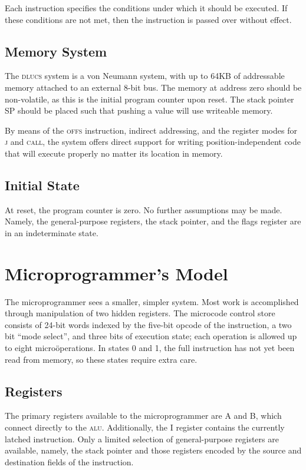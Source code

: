 \documentclass[11pt]{book}
\begin{document}
Each instruction specifies the conditions
under which it should be executed.
If these conditions are not met,
then the instruction is passed over without effect.

\subsection{Memory System}
The \textsc{dlucs} system is a von Neumann system,
with up to 64KB of addressable memory
attached to an external 8-bit bus.
The memory at address zero should be non-volatile,
as this is the initial program counter upon reset.
The stack pointer SP should be placed
such that pushing a value will use writeable memory.

By means of the \textsc{offs} instruction,
indirect addressing, and
the register modes for \textsc{j} and \textsc{call},
the system offers direct support
for writing position-independent code
that will execute properly no matter its location in memory.

\subsection{Initial State}
At reset, the program counter is zero.
No further assumptions may be made.
Namely, the general-purpose registers,
the stack pointer,
and the flags register are in an indeterminate state.

\section{Microprogrammer's Model}
The micro\-programmer sees a smaller, simpler system.
Most work is accomplished through manipulation of two hidden registers.
The microcode control store consists of
24-bit words indexed by the five-bit opcode of the instruction,
a two bit ``mode select'',
and three bits of execution state;
each operation is allowed up to eight micro\"operations.
In states 0 and 1, the full instruction has not yet been read
from memory, so these states require extra care.

\subsection{Registers}
The primary registers available to the micro\-programmer are
A and B, which connect directly to the \textsc{alu}.
Additionally, the I register contains the currently latched instruction.
Only a limited selection of general-purpose registers are available,
namely, the stack pointer
and those registers encoded by the source and destination fields
of the instruction.
\end{document}

